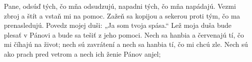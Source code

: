 Pane, odsúď tých, čo mňa odsudzujú,
napadni tých, čo mňa napádajú.
\versseparator
Vezmi zbroj a štít
a vstaň mi na pomoc.
\versseparator
Zažeň sa kopijou a sekerou
proti tým, čo ma prenasledujú.
Povedz mojej duši: „Ja som tvoja spása.“
\versseparator
Lež moja duša bude plesať v Pánovi
a bude sa tešiť z jeho pomoci.
\versseparator
Nech sa hanbia a červenajú tí,
čo mi číhajú na život;
\versseparator
nech sú zavrátení a nech sa hanbia tí,
čo mi chcú zle.
\versseparator
Nech sú ako prach pred vetrom
a nech ich ženie Pánov anjel;